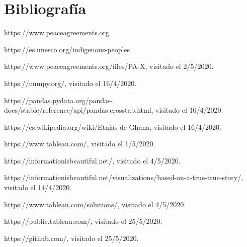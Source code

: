 \documentclass[11pt]{article}
\begin{document}
\section{Bibliografía}

\begin{thebibliography}{X}
https://www.peaceagreements.org

 https://es.unesco.org/indigenous-peoples

 https://www.peaceagreements.org/files/PA-X, visitado el 2/5/2020.

 https://numpy.org/, visitado el 16/4/2020.

 https://pandas.pydata.org/pandas-docs/stable/reference/api/pandas.crosstab.html, visitado el 16/4/2020.

 https://es.wikipedia.org/wiki/Etnias-de-Ghana, visitado el 16/4/2020.

 https://www.tableau.com/, visitado el 1/5/2020.

 https://informationisbeautiful.net/, visitado el 4/5/2020.

 https://informationisbeautiful.net/visualizations/based-on-a-true-true-story/, visitado el 14/4/2020.


 https://www.tableau.com/solutions/, visitado el 4/5/2020.

 https://public.tableau.com/, visitado el 25/5/2020.

 https://github.com/, visitado el 25/5/2020.

\end{thebibliography}
\end{document}
